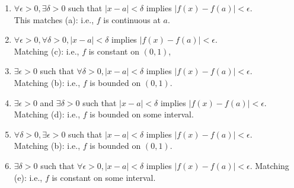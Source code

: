 \documentclass[12pt]{article}
\begin{document}
\begin{enumerate}
    \item $\forall \epsilon > 0, \exists \delta > 0$ such that $|x - a| < \delta$ implies $|f(x) - f(a)| < \epsilon$. \\
		This matches (a): i.e., $f$ is continuous at $a$.
    \item $\forall \epsilon > 0, \forall \delta > 0, |x - a| < \delta$ implies $|f(x) - f(a)| < \epsilon$. \\
		Matching (c): i.e., $f$ is constant on $(0, 1)$,
    \item $\exists \epsilon > 0$ such that $\forall \delta > 0, |x - a| < \delta$ implies $|f(x) - f(a)| < \epsilon$. \\
		Matching (b): i.e., $f$ is bounded on $(0, 1)$.
    \item $\exists \epsilon > 0$ and $\exists \delta > 0$ such that $|x - a| < \delta$ implies $|f(x) - f(a)| < \epsilon$. \\
		Matching (d): i.e., $f$ is bounded on some interval.
    \item $\forall \delta > 0, \exists \epsilon > 0$ such that $|x - a| < \delta$ implies $|f(x) - f(a)| < \epsilon$. \\
		Matching (b): i.e., $f$ is bounded on $(0, 1)$.
    \item $\exists \delta > 0$ such that $\forall \epsilon > 0, |x - a| < \delta$ implies $|f(x) - f(a)| < \epsilon$.
		Matching (e): i.e., $f$ is constant on some interval.
\end{enumerate}
\end{document}
